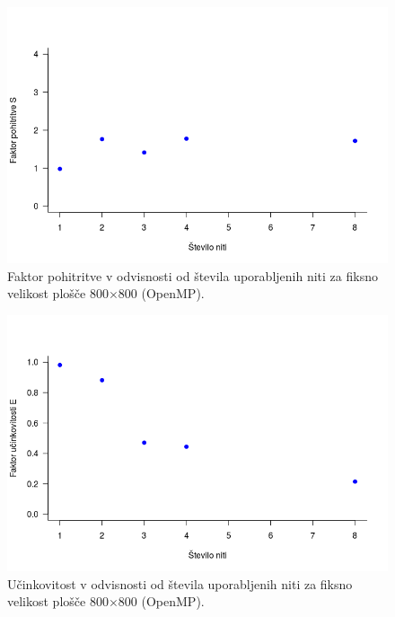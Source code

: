 \documentclass[a4paper,titlepage,11pt]{article}
\begin{document}
\begin{figure}[H]
\begin{center}
\includegraphics[scale=0.6]{graf-rezultati-3_2.png}
\caption{Faktor pohitritve v odvisnosti od števila uporabljenih niti za fiksno velikost plošče 800$\times$800 (OpenMP).}
\label{graf-rezultati-pohitritev-3}
\end{center}
\vspace{-25pt}
\end{figure}

\begin{figure}[H]
\begin{center}
\includegraphics[scale=0.6]{graf-rezultati-3_3.png}
\caption{Učinkovitost v odvisnosti od števila uporabljenih niti za fiksno velikost plošče 800$\times$800 (OpenMP).}
\label{graf-rezultati-ucinkovitost-3}
\end{center}
\vspace{-25pt}
\end{figure}
\end{document}
